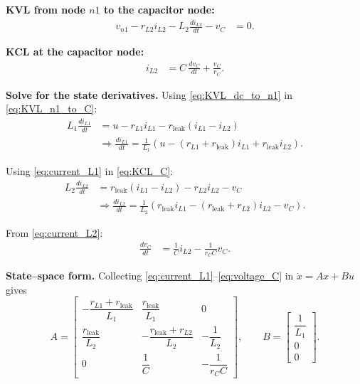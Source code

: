 \textbf{KVL from node $n1$ to the capacitor node:}
\begin{align}
    v_{n1} - r_{L2} i_{L2} - L_2 \frac{di_{L2}}{dt} - v_C &= 0. \label{eq:KVL_n1_to_C}
\end{align}

\textbf{KCL at the capacitor node:}
\begin{align}
    i_{L2} &= C\,\frac{dv_C}{dt} + \frac{v_C}{r_C}. \label{eq:KCL_C}
\end{align}

\textbf{Solve for the state derivatives.}
Using \ref{eq:KVL_dc_to_n1} in \ref{eq:KVL_n1_to_C}:
\begin{align}
    L_1 \frac{di_{L1}}{dt} &= u - r_{L1}i_{L1} - r_{\text{leak}}(i_{L1} - i_{L2}) \nonumber \\
    &\Rightarrow \frac{di_{L1}}{dt} = \frac{1}{L_1} \left(u - (r_{L1} + r_{\text{leak}}) i_{L1} + r_{\text{leak}} i_{L2}\right). \label{eq:current_L1}
\end{align}

Using \ref{eq:current_L1} in \ref{eq:KCL_C}:
\begin{align}
    L_2 \frac{di_{L2}}{dt} &= r_{\text{leak}}(i_{L1} - i_{L2}) - r_{L2}i_{L2} - v_C \nonumber \\
    &\Rightarrow \frac{di_{L2}}{dt} = \frac{1}{L_2} \left(r_{\text{leak}} i_{L1} - (r_{\text{leak}} + r_{L2}) i_{L2} - v_C\right). \label{eq:current_L2}
\end{align}

From \ref{eq:current_L2}:
\begin{align}
    \frac{dv_C}{dt} &= \frac{1}{C} i_{L2} - \frac{1}{r_C C} v_C. \label{eq:voltage_C}
\end{align}

\textbf{State–space form.}
Collecting \ref{eq:current_L1}–\ref{eq:voltage_C} in $\dot x = A x + B u$ gives
\[
\boxed{
A =
\begin{bmatrix}
-\dfrac{r_{L1}+r_{\text{leak}}}{L_1} & \dfrac{r_{\text{leak}}}{L_1} & 0\\[10pt]
\dfrac{r_{\text{leak}}}{L_2} & -\dfrac{r_{\text{leak}}+r_{L2}}{L_2} & -\dfrac{1}{L_2}\\[10pt]
0 & \dfrac{1}{C} & -\dfrac{1}{r_C C}
\end{bmatrix},
\qquad
B =
\begin{bmatrix}
\dfrac{1}{L_1}\\[6pt] 0\\[6pt] 0
\end{bmatrix}.
}
\]

